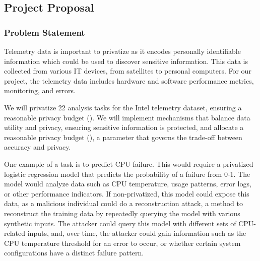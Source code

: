 \documentclass[12pt,letterpaper]{article}
\begin{document}
\begin{table}[h]
\makereference








\clearpage
\makeappendix

\subsection{Project Proposal}


% 

\subsubsection{Problem Statement}

Telemetry data is important to privatize as it encodes personally identifiable information which could be used to discover sensitive information. This data is collected from various IT devices, from satellites to personal computers. For our project, the telemetry data includes hardware and software performance metrics, monitoring, and errors. 

We will privatize 22 analysis tasks for the Intel telemetry dataset, ensuring a reasonable privacy budget (). We will implement mechanisms that balance data utility and privacy, ensuring sensitive information is protected, and allocate a reasonable privacy budget (), a parameter that governs the trade-off between accuracy and privacy.

One example of a task is to predict CPU failure. This would require a privatized logistic regression model that predicts the probability of a failure from 0-1. The model would analyze data such as CPU temperature, usage patterns, error logs, or other performance indicators. If non-privatized, this model could expose this data, as a malicious individual could do a reconstruction attack, a method to reconstruct the training data by repeatedly querying the model with various synthetic inputs. The attacker could query this model with different sets of CPU-related inputs, and, over time, the attacker could gain information such as the CPU temperature threshold for an error to occur, or whether certain system configurations have a distinct failure pattern.


\end{table}
\end{document}
